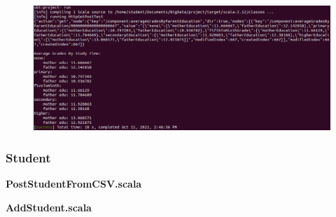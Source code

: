 \FigureCounter
\begin{figure}[H]
  \centering
  \includegraphics[width=\textwidth]{images/milepael3/GetAvgGradesByParentEduTerminal.png}
\end{figure}

\subsubsection{Student}
\textbf{PostStudentFromCSV.scala}\\

\textbf{AddStudent.scala}\\
